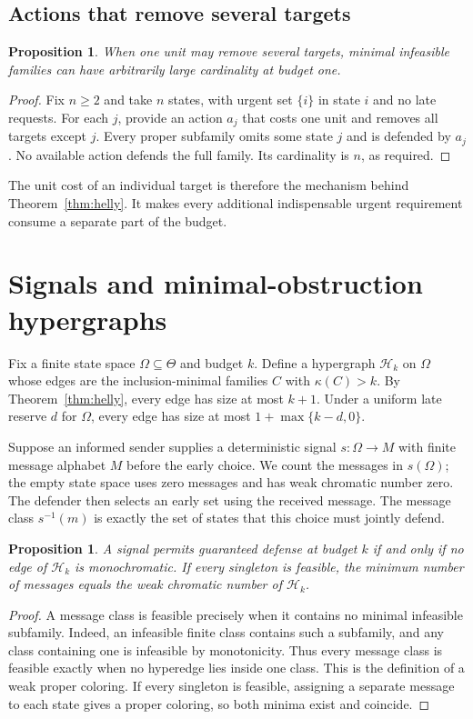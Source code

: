 \documentclass[11pt,a4paper]{amsart}
\newtheorem{proposition}[theorem]{Proposition}
\theoremstyle{definition}
\theoremstyle{remark}
\begin{document}
\subsection{Actions that remove several targets}
\begin{proposition}\label{prop:area}
When one unit may remove several targets, minimal infeasible families
can have arbitrarily large cardinality at budget one.
\end{proposition}
\begin{proof}
Fix $n\ge2$ and take $n$ states, with urgent set $\{i\}$ in state $i$
and no late requests. For each $j$, provide an action $a_j$ that costs
one unit and removes all targets except $j$. Every proper subfamily
omits some state $j$ and is defended by $a_j$. No available action
defends the full family. Its cardinality is $n$, as required.
\end{proof}

The unit cost of an individual target is therefore the mechanism behind
Theorem~\ref{thm:helly}. It makes every additional indispensable urgent
requirement consume a separate part of the budget.

\section{Signals and minimal-obstruction hypergraphs}\label{sec:signals}

Fix a finite state space $\Omega\subseteq\Theta$ and budget $k$.
Define a hypergraph $\mathcal H_k$ on $\Omega$ whose edges are the
inclusion-minimal families $C$ with $\kappa(C)>k$. By
Theorem~\ref{thm:helly}, every edge has size at most $k+1$.
Under a uniform late reserve $d$ for $\Omega$, every edge has size at
most $1+\max\{k-d,0\}$.

Suppose an informed sender supplies a deterministic signal
$s:\Omega\to M$ with finite message alphabet $M$ before the early choice.
We count the messages in $s(\Omega)$; the empty state space uses zero
messages and has weak chromatic number zero. The defender then selects an
early set using the received message. The message class $s^{-1}(m)$
is exactly the set of states that this choice must jointly defend.

\begin{proposition}\label{prop:signal}
A signal permits guaranteed defense at budget $k$ if and only if no
edge of $\mathcal H_k$ is monochromatic. If every singleton is feasible,
the minimum number of messages equals the weak chromatic number of
$\mathcal H_k$.
\end{proposition}
\begin{proof}
A message class is feasible precisely when it contains no minimal
infeasible subfamily. Indeed, an infeasible finite class contains such
a subfamily, and any class containing one is infeasible by monotonicity.
Thus every message class is feasible exactly when no hyperedge lies
inside one class. This is the definition of a weak proper coloring.
If every singleton is feasible, assigning a separate message to each
state gives a proper coloring, so both minima exist and coincide.
\end{proof}
\end{document}
